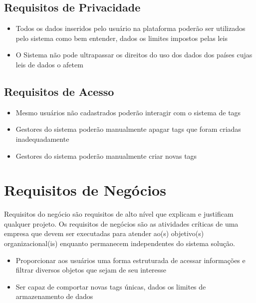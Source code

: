     \subsection{Requisitos de Privacidade}
        \begin{itemize}
            \item Todos os dados inseridos pelo usuário na plataforma poderão ser utilizados pelo sistema como bem entender, dados os limites impostos pelas leis
            \item O Sistema não pode ultrapassar os direitos do uso dos dados dos países cujas leis de dados o afetem
        \end{itemize}
    \subsection{Requisitos de Acesso}
        \begin{itemize}
            \item Mesmo usuários não cadastrados poderão interagir com o sistema de tags
            \item Gestores do sistema poderão manualmente apagar tags que foram criadas inadequadamente
            \item Gestores do sistema poderão manualmente criar novas tags
        \end{itemize}

 \section{Requisitos de Negócios}
     Requisitos do negócio são requisitos de alto nível que explicam e justificam qualquer projeto. Os requisitos de negócios são as atividades críticas de uma empresa que devem ser executadas para atender ao(s) objetivo(s) organizacional(is) enquanto permanecem independentes do sistema solução.

    \begin{itemize}
        \item Proporcionar aos usuários uma forma estruturada de acessar informações e filtrar diversos objetos que sejam de seu interesse
        \item Ser capaz de comportar novas tags únicas, dados os limites de armazenamento de dados
    \end{itemize}

\begin{comment}
    Prof. Dr. Ausberto S. Castro Vera
    UENF - CCT - LCMAT - Curso de Ciência da Computação
    Campos, RJ, 2022 
    Disciplina: Paradigma de Desenvolvimento Orientado a Objetos
    Aluno: João Vítor Fernandes Dias
\end{comment}